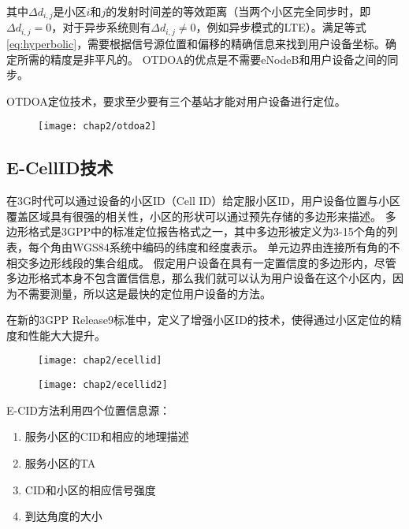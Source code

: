 其中$\Delta d_{i,j}$是小区$i$和$j$的发射时间差的等效距离（当两个小区完全同步时，即$\Delta d_{i,j} = 0$，对于异步系统则有$\Delta d_{i,j} \ne 0$，例如异步模式的LTE）。满足等式\ref{eq:hyperbolic}，需要根据信号源位置和偏移的精确信息来找到用户设备坐标。确定所需的精度是非平凡的。 OTDOA的优点是不需要eNodeB和用户设备之间的同步。

OTDOA定位技术，要求至少要有三个基站才能对用户设备进行定位。

\begin{figure}[!htp]
  \centering
  \texttt{[image: chap2/otdoa2]}
\end{figure}

\subsection{E-CellID技术}

在3G时代可以通过设备的小区ID（Cell ID）\cite{trevisani2004cell}给定服小区ID，用户设备位置与小区覆盖区域具有很强的相关性，小区的形状可以通过预先存储的多边形来描述\cite{adams2003location}。 多边形格式是3GPP\cite{3gpp}中的标准定位报告格式之一，其中多边形被定义为3-15个角的列表，每个角由WGS84系统中编码的纬度和经度表示。 单元边界由连接所有角的不相交多边形线段的集合组成。 假定用户设备在具有一定置信度的多边形内，尽管多边形格式本身不包含置信信息，那么我们就可以认为用户设备在这个小区内，因为不需要测量，所以这是最快的定位用户设备的方法。

在新的3GPP Release9标准中，定义了增强小区ID的技术，使得通过小区定位的精度和性能大大提升。

\begin{figure}[!htp]
  \centering
  \texttt{[image: chap2/ecellid]}
\end{figure}

\begin{figure}[!htp]
  \centering
  \texttt{[image: chap2/ecellid2]}
\end{figure}

E-CID方法利用四个位置信息源：
\begin{enumerate}
    \item 服务小区的CID和相应的地理描述
    \item 服务小区的TA
    \item CID和小区的相应信号强度
    \item 到达角度的大小
\end{enumerate}

